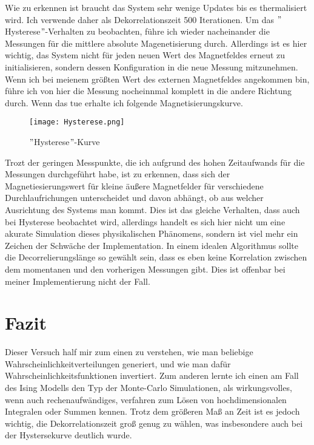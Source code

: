 \documentclass[12pt]{article}
\begin{document}
Wie zu erkennen ist braucht das System sehr wenige Updates bis es thermalisiert wird. Ich verwende daher als Dekorrelationszeit 500 Iterationen. Um das $"$Hysterese$"$-Verhalten zu beobachten, führe ich wieder nacheinander die Messungen für die mittlere absolute Magenetisierung durch. Allerdings ist es hier wichtig, das System nicht für jeden neuen Wert des Magnetfeldes erneut zu initialisieren, sondern dessen Konfiguration in die neue Messung mitzunehmen. Wenn ich bei meienem größten Wert des externen Magnetfeldes angekommen bin, führe ich von hier die Messung nocheinnmal komplett in die andere Richtung durch. Wenn das tue erhalte ich folgende Magnetisierungskurve.
\begin{figure}[H]\centering\texttt{[image: Hysterese.png]}\caption{$"$Hysterese$"$-Kurve}\end{figure}
Trozt der geringen Messpunkte, die ich aufgrund des hohen Zeitaufwands für die Messungen durchgeführt habe, ist zu erkennen, dass sich der Magnetiesierungswert für kleine äußere Magnetfelder für verschiedene Durchlaufrichungen unterscheidet und davon abhängt, ob aus welcher  Ausrichtung des Systems man kommt. Dies ist das gleiche Verhalten, dass auch bei Hysterese beobachtet wird, allerdings handelt es sich hier nicht um eine akurate Simulation dieses physikalischen Phänomens, sondern ist viel mehr ein Zeichen der Schwäche der Implementation. In einem idealen Algorithmus sollte die Decorrelierungslänge so gewählt sein, dass es eben keine Korrelation zwischen dem momentanen und den vorherigen Messungen gibt. Dies ist offenbar bei meiner Implementierung nicht der Fall.


\section{Fazit}
Dieser Versuch half mir zum einen zu verstehen, wie man beliebige Wahrscheinlichkeitverteilungen generiert, und wie man dafür Wahrscheinlichkeitsfunktionen invertiert. Zum anderen lernte ich einen am Fall des Ising Modells den Typ der Monte-Carlo Simulationen, als wirkungsvolles, wenn auch rechenaufwändiges, verfahren zum Lösen von hochdimensionalen Integralen oder Summen kennen. Trotz dem größeren Maß an Zeit ist es jedoch wichtig, die Dekorrelationszeit groß genug zu wählen, was insbesondere auch bei der Hystersekurve deutlich wurde.
\end{document}
